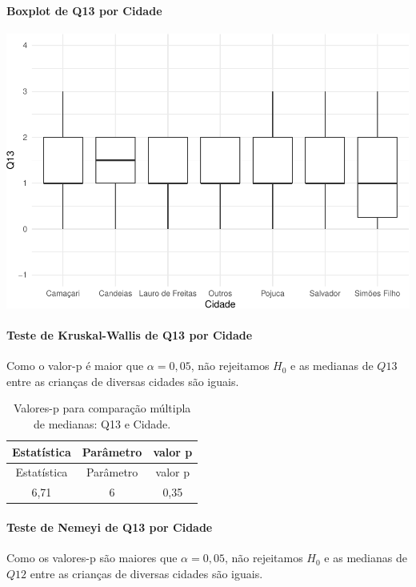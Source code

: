 \documentclass[]{article}
\let\oldparagraph\paragraph
\renewcommand{\paragraph}[1]{\oldparagraph{#1}\mbox{}}
\begin{document}
\hypertarget{boxplot-de-q13-por-cidade}{%
\paragraph{Boxplot de Q13 por Cidade}\label{boxplot-de-q13-por-cidade}}

\begin{center}\includegraphics[width=0.75\linewidth]{relatorio_files/figure-latex/unnamed-chunk-59-1} \end{center}

\hypertarget{teste-de-kruskal-wallis-de-q13-por-cidade}{%
\paragraph{Teste de Kruskal-Wallis de Q13 por Cidade}\label{teste-de-kruskal-wallis-de-q13-por-cidade}}

Como o valor-p é maior que \(\alpha=0,05\), não rejeitamos \(H_0\) e as medianas de \(Q13\) entre as crianças de diversas cidades são iguais.

\begin{longtable}[]{@{}ccc@{}}
\caption{\label{tab:unnamed-chunk-60}Valores-p para comparação múltipla de medianas: Q13 e Cidade.}\tabularnewline
\toprule
Estatística & Parâmetro & valor p\tabularnewline
\midrule
\endfirsthead
\toprule
Estatística & Parâmetro & valor p\tabularnewline
\midrule
\endhead
6,71 & 6 & 0,35\tabularnewline
\bottomrule
\end{longtable}

\hypertarget{teste-de-nemeyi-de-q13-por-cidade}{%
\paragraph{Teste de Nemeyi de Q13 por Cidade}\label{teste-de-nemeyi-de-q13-por-cidade}}

Como os valores-p são maiores que \(\alpha=0,05\), não rejeitamos \(H_0\) e as medianas de \(Q12\) entre as crianças de diversas cidades são iguais.
\end{document}
